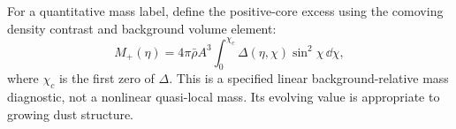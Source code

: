 For a quantitative mass label, define the positive-core excess using
the comoving density contrast and background volume element:
\begin{equation}\label{eq:mass}
 M_+(\eta)=4\pi\bar\rho A^3
 \int_0^{\chi_c}\Delta(\eta,\chi)\sin^2\chi\,\dd\chi,
\end{equation}
where $\chi_c$ is the first zero of $\Delta$. This is a specified linear
background-relative mass diagnostic, not a nonlinear quasi-local mass.
Its evolving value is appropriate to growing dust structure.
